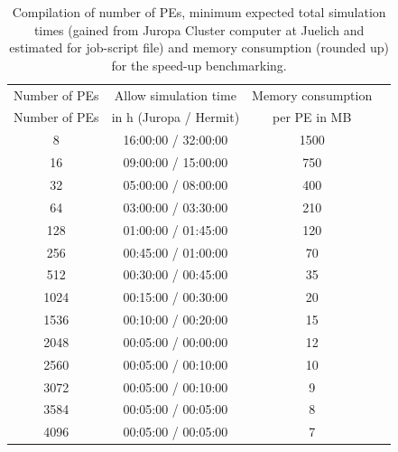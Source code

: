\documentclass[11pt,onecolumn,oneside]{article}
\begin{document}
\begin{table}[hbt]
\begin{center}
\begin{tabular}{|c|c|c|l|} \hline 
Number of PEs &  Allow simulation time  & Memory consumption \\
Number of PEs & in h (Juropa / Hermit) & per PE in MB\\  \hline
8    &  16:00:00 / 32:00:00 & 1500 \\
16   &  09:00:00 / 15:00:00 & 750  \\
32   &  05:00:00 / 08:00:00 & 400  \\
64   &  03:00:00 / 03:30:00 & 210 \\
128  &  01:00:00 / 01:45:00 & 120 \\
256  &  00:45:00 / 01:00:00 & 70  \\
512  &  00:30:00 / 00:45:00 & 35  \\
1024 &  00:15:00 / 00:30:00 & 20  \\
1536 &  00:10:00 / 00:20:00 & 15  \\
2048 &  00:05:00 / 00:00:00 & 12  \\
2560 &  00:05:00 / 00:10:00 & 10  \\
3072 &  00:05:00 / 00:10:00 & 9   \\
3584 &  00:05:00 / 00:05:00 & 8   \\
4096 &  00:05:00 / 00:05:00 & 7   \\ \hline
\end{tabular} 
\caption{Compilation of number of PEs, minimum expected total simulation times (gained from Juropa Cluster computer at Juelich and estimated for job-script file) and memory consumption (rounded up) for the speed-up benchmarking.}
\label{tab:speedup_benchmark}
\end{center}
\end{table}


\clearpage
\end{document}
